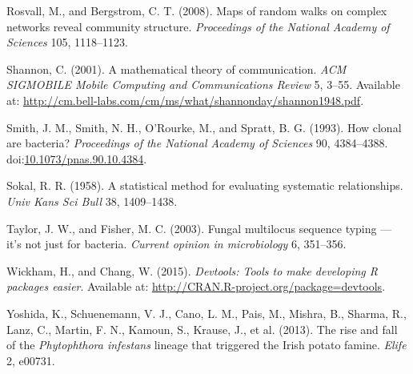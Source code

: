\documentclass{frontiersSCNS} %
\begin{document}
Rosvall, M., and Bergstrom, C. T. (2008). Maps of random walks on
complex networks reveal community structure. \emph{Proceedings of the
National Academy of Sciences} 105, 1118--1123.

Shannon, C. (2001). A mathematical theory of communication. \emph{ACM
SIGMOBILE Mobile Computing and Communications Review} 5, 3--55.
Available at:
\url{http://cm.bell-labs.com/cm/ms/what/shannonday/shannon1948.pdf}.

Smith, J. M., Smith, N. H., O'Rourke, M., and Spratt, B. G. (1993). How
clonal are bacteria? \emph{Proceedings of the National Academy of
Sciences} 90, 4384--4388.
doi:\href{http://dx.doi.org/10.1073/pnas.90.10.4384}{10.1073/pnas.90.10.4384}.

Sokal, R. R. (1958). A statistical method for evaluating systematic
relationships. \emph{Univ Kans Sci Bull} 38, 1409--1438.

Taylor, J. W., and Fisher, M. C. (2003). Fungal multilocus sequence
typing --- it's not just for bacteria. \emph{Current opinion in
microbiology} 6, 351--356.

Wickham, H., and Chang, W. (2015). \emph{Devtools: Tools to make
developing R packages easier}. Available at:
\url{http://CRAN.R-project.org/package=devtools}.

Yoshida, K., Schuenemann, V. J., Cano, L. M., Pais, M., Mishra, B.,
Sharma, R., Lanz, C., Martin, F. N., Kamoun, S., Krause, J., et al.
(2013). The rise and fall of the \emph{Phytophthora infestans} lineage
that triggered the Irish potato famine. \emph{Elife} 2, e00731.
\end{document}
